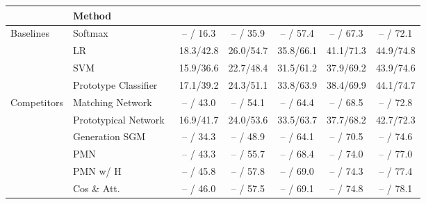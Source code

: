 \documentclass[10pt,letterpaper,twocolumn]{article}
\providecommand{\tabularnewline}{\\}
\begin{document}
\begin{table*}
\begin{centering}
\begin{tabular}{llccccc}
\hline 
 & {\small{}{}{}{}{}{}Method } & {\small{}{}{}{}{}{}  } & {\small{}{}{}{}{}{}  } & {\small{}{}{}{}{}{}  } & {\small{}{}{}{}{}{}  } & {\small{}{}{}{}{}{}}\tabularnewline
\hline 
\hline 
\multirow{4}{*}{{\small{}Baselines }} & {\small{}{}{}{}{}{}Softmax  } & {\small{}{}{}{}{}{}-- / 16.3  } & {\small{}{}{}{}{}{}-- / 35.9  } & {\small{}{}{}{}{}{}-- / 57.4  } & {\small{}{}{}{}{}{}-- / 67.3  } & {\small{}{}{}{}{}{}-- / 72.1}\tabularnewline
 & {\small{}{}{}{}{}{}LR  } & {\small{}18.3{}/42.8  } & {\small{}{}{}{}{}{}{}26.0{}/54.7  } & {\small{}{}{}{}{}{}{}35.8{}/66.1  } & {\small{}{}{}{}{}{}{}41.1{}/71.3  } & {\small{}{}{}{}{}{}{}44.9{}/74.8 }\tabularnewline
 & {\small{}{}{}{}{}{}SVM  } & {\small{}{}{}{}{}{}15.9/36.6  } & {\small{}{}{}{}{}{}22.7/48.4  } & {\small{}{}{}{}{}{}31.5/61.2  } & {\small{}{}{}{}{}{}37.9/69.2  } & {\small{}{}{}{}{}{}43.9/74.6}\tabularnewline
 & {\small{}{}{}{}{}{}Prototype Classifier  } & {\small{}{}{}{}{}{}17.1/39.2  } & {\small{}{}{}{}{}{}24.3/51.1  } & {\small{}{}{}{}{}{}33.8/63.9  } & {\small{}{}{}{}{}{}38.4/69.9  } & {\small{}{}{}{}{}{}44.1/74.7 }\tabularnewline
\hline 
\hline 
\multirow{7}{*}{{\small{}Competitors }} 
& {\small{}{}{}{}{}{}Matching Network~\cite{matchingnet_1shot}
 } & {\small{}{}{}{}{}{}-- / 43.0  } & {\small{}{}{}{}{}{}-- / 54.1  } & {\small{}{}{}{}{}-- / 64.4  } & {\small{}{}{}{}{}{}-- / 68.5  } & {\small{}{}{}{}{}{}-- / 72.8 }\tabularnewline
 & {\small{}{}{}Prototypical Network~\cite{prototype_network} } & {\small{}{}{}{}{}{}16.9/41.7  } & {\small{}{}{}{}{}{}24.0/53.6  } & {\small{}{}{}{}{}{}33.5/63.7  } & {\small{}{}{}{}{}{}37.7/68.2  } & {\small{}{}{}{}{}{}42.7/72.3}\tabularnewline
 & {\small{}{}{}{}{}{}Generation SGM~\cite{2017ICCVaug} } & {\small{}{}{}{}{}{}-- / 34.3  } & {\small{}{}{}{}{}{}-- / 48.9  } & {\small{}{}{}{}{}{}-- / 64.1  } & {\small{}{}{}{}{}{}-- / 70.5  } & {\small{}{}{}{}{}{}-- / 74.6}\tabularnewline
 & {\small{}{}{}PMN~\cite{imaginaryData} } & {\small{}{}{}-- / 43.3  } & {\small{}{}{}-- / 55.7  } & {\small{}{}{}-- / 68.4  } & {\small{}{}{}-- / 74.0  } & {\small{}{}{}-- / 77.0}\tabularnewline
 & {\small{}{}{}PMN w/ H~\cite{imaginaryData} } & {\small{}{}{}-- / 45.8  } & {\small{}{}{}-- / 57.8  } & {\small{}{}{}-- / 69.0  } & {\small{}{}{}-- / 74.3  } & {\small{}{}{}-- / 77.4}\tabularnewline
 & {\small{}{}{}Cos \& Att.~\cite{dym} } & {\small{}{}{}-- / 46.0  } & {\small{}{}{}-- / 57.5  } & {\small{}{}{}-- / 69.1  } & {\small{}{}{}-- / 74.8}{\small{}{}  } & {\small{}{}{}-- / 78.1}\tabularnewline

\end{tabular}
\end{centering}
\end{table*}
\end{document}
